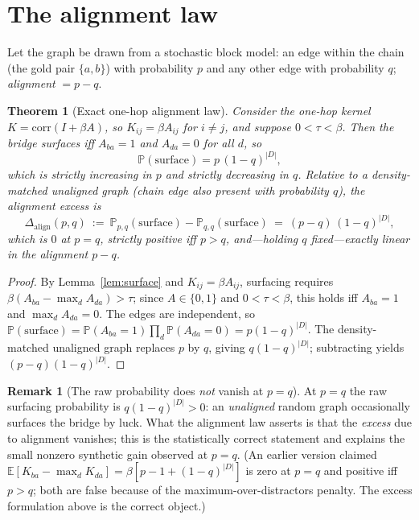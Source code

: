\documentclass[11pt]{article}
\theoremstyle{plain}\newtheorem{theorem}{Theorem}\newtheorem{lemma}{Lemma}\newtheorem{proposition}{Proposition}
\theoremstyle{definition}\newtheorem{assumption}{Assumption}\newtheorem{remark}{Remark}
\newcommand{\E}{\mathbb{E}}\newcommand{\Pf}{\mathbb{P}}\newcommand{\N}{\mathcal{N}}\newcommand{\corr}{\mathrm{corr}}
\begin{document}
\section{The alignment law}
Let the graph be drawn from a stochastic block model: an edge within the chain (the gold pair $\{a,b\}$) with
probability $p$ and any other edge with probability $q$; \emph{alignment} $=p-q$.
\begin{theorem}[Exact one-hop alignment law]\label{thm:onehop}
Consider the one-hop kernel $K=\corr(I+\beta A)$, so $K_{ij}=\beta A_{ij}$ for $i\neq j$, and suppose
$0<\tau<\beta$. Then the bridge surfaces iff $A_{ba}=1$ and $A_{da}=0$ for all $d$, so
\[
   \Pf(\text{surface})=p\,(1-q)^{|D|},
\]
which is strictly increasing in $p$ and strictly decreasing in $q$. Relative to a \emph{density-matched unaligned}
graph (chain edge also present with probability $q$), the \emph{alignment excess} is
\[
   \Delta_{\mathrm{align}}(p,q)\ :=\ \Pf_{p,q}(\text{surface})-\Pf_{q,q}(\text{surface})\ =\ (p-q)\,(1-q)^{|D|},
\]
which is $0$ at $p=q$, strictly positive iff $p>q$, and---holding $q$ fixed---exactly linear in the alignment
$p-q$.
\end{theorem}
\begin{proof}
By Lemma~\ref{lem:surface} and $K_{ij}=\beta A_{ij}$, surfacing requires $\beta(A_{ba}-\max_d A_{da})>\tau$; since
$A\in\{0,1\}$ and $0<\tau<\beta$, this holds iff $A_{ba}=1$ and $\max_d A_{da}=0$. The edges are independent, so
$\Pf(\text{surface})=\Pf(A_{ba}=1)\prod_{d}\Pf(A_{da}=0)=p(1-q)^{|D|}$. The density-matched unaligned graph replaces
$p$ by $q$, giving $q(1-q)^{|D|}$; subtracting yields $(p-q)(1-q)^{|D|}$.
\end{proof}
\begin{remark}[The raw probability does \emph{not} vanish at $p=q$]
At $p=q$ the raw surfacing probability is $q(1-q)^{|D|}>0$: an \emph{unaligned} random graph occasionally surfaces
the bridge by luck. What the alignment law asserts is that the \emph{excess} due to alignment vanishes; this is the
statistically correct statement and explains the small nonzero synthetic gain observed at $p=q$. (An earlier
version claimed $\E[K_{ba}-\max_d K_{da}]=\beta[p-1+(1-q)^{|D|}]$ is zero at $p=q$ and positive iff $p>q$; both are
false because of the maximum-over-distractors penalty. The excess formulation above is the correct object.)
\end{remark}
\end{document}
